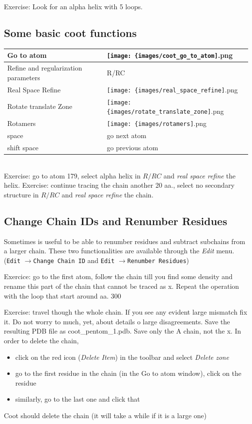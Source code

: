 \documentclass[12pt]{article} %
\newcommand{\ttt}[1]{\texttt{#1}}
\newcommand{\iii}[1]{\textit{#1}}
\newcommand{\ra}{$\rightarrow$}
\begin{document}
Exercise: Look for an alpha helix with 5 loops.

\subsection{Some basic coot functions}

  \begin{tabular}{ l l }
  \hline
  Go to atom  & \texttt{[image: \{images/coot\_go\_to\_atom]}.png} (F6)\\\hline
  Refine and regularization parameters & R/RC\\\hline
  Real Space Refine  & \texttt{[image: \{images/real\_space\_refine]}.png}\\\hline
  Rotate translate Zone & \texttt{[image: \{images/rotate\_translate\_zone]}.png}\\\hline
  Rotamers & \texttt{[image: \{images/rotamers]}.png}\\\hline
  space & go next atom\\\hline
  shift space & go previous atom\\\hline
    
\end{tabular}\\  
  Exercise: go to atom 179, select alpha helix in $R/RC$ and \iii{real space refine} the helix.
  Exercise: continue tracing the chain another 20 aa., select no secondary structure in $R/RC$ and \iii{real space refine} the chain.
\subsection{Change Chain IDs and Renumber Residues}
Sometimes is useful to be able to renumber residues and subtract subchains from a larger chain. These two functionalities are available through the \iii{Edit} menu. (\ttt{Edit} \ra \ttt{Change Chain ID}  and \ttt{Edit} \ra \ttt{Renumber Residues})

Exercice: go to the first atom, follow the chain till you find some density and rename this part of the chain that cannot be traced as x. Repeat the operation with the loop that start around aa. 300

Exercise: travel though the whole chain. If you see any evident large mismatch fix it. Do not worry to much, yet, about details o large disagreements.	 Save the resulting PDB file as coot\_pentom\_1.pdb. Save only the A chain, not the x. In order to delete the chain,
\begin{itemize}
 \item click on the red icon (\iii{Delete Item}) in the toolbar and select \iii{Delete zone}
 \item go to the first residue in the chain (in the Go to atom window), click on the residue
 \item similarly, go to the last one and click that
\end{itemize}
Coot should delete the chain (it will take a while if it is a large one)
\end{document}
